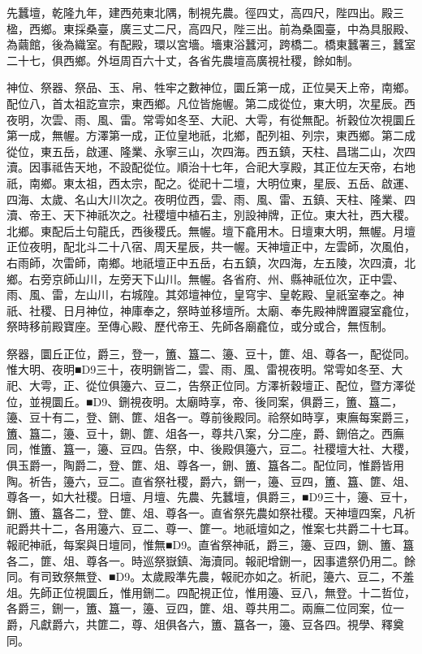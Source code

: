 \begin{pinyinscope}
先蠶壇，乾隆九年，建西苑東北隅，制視先農。徑四丈，高四尺，陛四出。殿三楹，西鄉。東採桑臺，廣三丈二尺，高四尺，陛三出。前為桑園臺，中為具服殿、為繭館，後為織室。有配殿，環以宮墻。墻東浴蠶河，跨橋二。橋東蠶署三，蠶室二十七，俱西鄉。外垣周百六十丈，各省先農壇高廣視社稷，餘如制。

神位、祭器、祭品、玉、帛、牲牢之數神位，圜丘第一成，正位昊天上帝，南鄉。配位八，首太祖訖宣宗，東西鄉。凡位皆施幄。第二成從位，東大明，次星辰。西夜明，次雲、雨、風、雷。常雩如冬至、大祀、大雩，有從無配。祈穀位次視圜丘第一成，無幄。方澤第一成，正位皇地祇，北鄉，配列祖、列宗，東西鄉。第二成從位，東五岳，啟運、隆業、永寧三山，次四海。西五鎮，天柱、昌瑞二山，次四瀆。因事祗告天地，不設配從位。順治十七年，合祀大享殿，其正位左天帝，右地祇，南鄉。東太祖，西太宗，配之。從祀十二壇，大明位東，星辰、五岳、啟運、四海、太歲、名山大川次之。夜明位西，雲、雨、風、雷、五鎮、天柱、隆業、四瀆、帝王、天下神祇次之。社稷壇中植石主，別設神牌，正位。東大社，西大稷。北鄉。東配后土句龍氏，西後稷氏。無幄。壇下龕用木。日壇東大明，無幄。月壇正位夜明，配北斗二十八宿、周天星辰，共一幄。天神壇正中，左雲師，次風伯，右雨師，次雷師，南鄉。地祇壇正中五岳，右五鎮，次四海，左五陵，次四瀆，北鄉。右旁京師山川，左旁天下山川。無幄。各省府、州、縣神祇位次，正中雲、雨、風、雷，左山川，右城隍。其郊壇神位，皇穹宇、皇乾殿、皇祇室奉之。神祇、社稷、日月神位，神庫奉之，祭時並移壇所。太廟、奉先殿神牌置寢室龕位，祭時移前殿寶座。至傳心殿、歷代帝王、先師各廟龕位，或分或合，無恆制。

祭器，圜丘正位，爵三，登一，簠、簋二、籩、豆十，篚、俎、尊各一，配從同。惟大明、夜明■D9三十，夜明鉶皆二，雲、雨、風、雷視夜明。常雩如冬至、大祀、大雩，正、從位俱籩六、豆二，告祭正位同。方澤祈穀壇正、配位，暨方澤從位，並視圜丘。■D9、鉶視夜明。太廟時享，帝、後同案，俱爵三，簠、簋二，籩、豆十有二，登、鉶、篚、俎各一。尊前後殿同。祫祭如時享，東廡每案爵三，簠、簋二，籩、豆十，鉶、篚、俎各一，尊共八案，分二座，爵、鉶倍之。西廡同，惟簠、簋一，籩、豆四。告祭，中、後殿俱籩六，豆二。社稷壇大社、大稷，俱玉爵一，陶爵二，登、篚、俎、尊各一，鉶、簠、簋各二。配位同，惟爵皆用陶。祈告，籩六，豆二。直省祭社稷，爵六，鉶一，籩、豆四，簠、簋、篚、俎、尊各一，如大社稷。日壇、月壇、先農、先蠶壇，俱爵三，■D9三十，籩、豆十，鉶、簠、簋各二，登、篚、俎、尊各一。直省祭先農如祭社稷。天神壇四案，凡祈祀爵共十二，各用籩六、豆二、尊一、篚一。地祇壇如之，惟案七共爵二十七耳。報祀神祇，每案與日壇同，惟無■D9。直省祭神祇，爵三，籩、豆四，鉶、簠、簋各二，篚、俎、尊各一。時巡祭嶽鎮、海瀆同。報祀增鉶一，因事遣祭仍用二。餘同。有司致祭無登、■D9。太歲殿準先農，報祀亦如之。祈祀，籩六、豆二，不羞俎。先師正位視圜丘，惟用鉶二。四配視正位，惟用籩、豆八，無登。十二哲位，各爵三，鉶一，簠、簋一，籩、豆四，篚、俎、尊共用二。兩廡二位同案，位一爵，凡獻爵六，共篚二，尊、俎俱各六，簠、簋各一，籩、豆各四。視學、釋奠同。


\end{pinyinscope}
